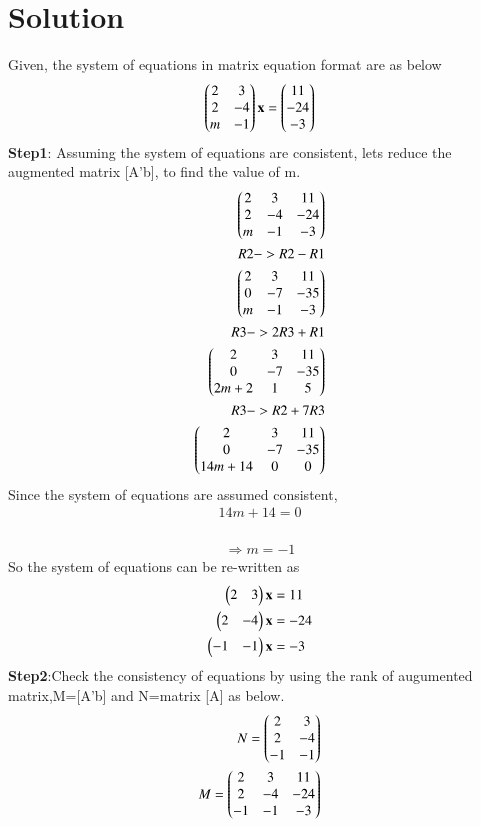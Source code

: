 \documentclass[journal,12pt,twocolumn]{IEEEtran}
\begin{document}
\section{Solution}
Given, the system of equations in matrix equation format are as below
\begin{align}
\begin{pmatrix}2 & 3\\2 & -4\\m & -1\end{pmatrix}
\mathbf{x}=
\begin{pmatrix}11\\-24\\-3\end{pmatrix}
\end{align}
\textbf{Step1}: Assuming the system of equations are consistent, lets reduce the  augmented matrix [A'b], to find the value of m.
\begin{align*}
\begin{pmatrix}2 & 3 & 11\\2 & -4 & -24\\m & -1 & -3\end{pmatrix}
\\R2 -> R2-R1\\
\begin{pmatrix}2 & 3 & 11\\0 & -7 & -35\\m & -1 & -3\end{pmatrix}
\\R3 -> 2R3+R1\\
\begin{pmatrix}2 & 3 & 11\\0 & -7 & -35\\2m+2 & 1 & 5\end{pmatrix}
\\R3 -> R2+7R3\\
\begin{pmatrix}2 & 3 & 11\\0 & -7 & -35\\14m+14 & 0 & 0\end{pmatrix}
\end{align*}
Since the system of equations are assumed consistent,
\begin{align}
14m+14 = 0
\end{align}
\\
\begin{align}
\Rightarrow m=-1
\end{align}
So the system of equations can be re-written as\\
\begin{align}
\begin{pmatrix}2 & 3 \end{pmatrix}\mathbf{x}&=11\\
\begin{pmatrix}2 & -4 \end{pmatrix}\mathbf{x}&=-24\\
\begin{pmatrix}-1 & -1 \end{pmatrix}\mathbf{x}&=-3
\end{align}
\textbf{Step2}:Check the consistency of equations by using the rank of augumented matrix,M=[A'b] and N=matrix [A] as below.
\begin{align*}
N=\begin{pmatrix}2 & 3\\2 & -4\\-1 & -1\end{pmatrix}\\
M=\begin{pmatrix}2 & 3 & 11\\2 & -4 & -24\\-1 & -1 & -3\end{pmatrix}
\end{align*}
\end{document}
